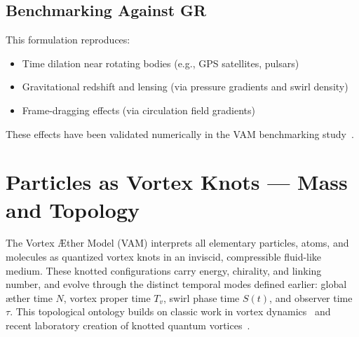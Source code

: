 \documentclass[preprint]{revtex4-2}
\begin{document}
    \subsection{Benchmarking Against GR}
    This formulation reproduces:
    \begin{itemize}
        \item Time dilation near rotating bodies (e.g., GPS satellites, pulsars)
        \item Gravitational redshift and lensing (via pressure gradients and swirl density)
        \item Frame-dragging effects (via circulation field gradients)
    \end{itemize}
    These effects have been validated numerically in the VAM benchmarking study~\cite{vam_benchmark2025}.


\section{Particles as Vortex Knots — Mass and Topology}
    The Vortex \AE{}ther Model (VAM) interprets all elementary particles, atoms, and molecules as quantized vortex knots in an inviscid, compressible fluid-like medium. These knotted configurations carry energy, chirality, and linking number, and evolve through the distinct temporal modes defined earlier: global æther time \( N \), vortex proper time \( T_v \), swirl phase time \( S(t) \), and observer time \( \tau \). This topological ontology builds on classic work in vortex dynamics~\cite{moffatt1969degree, arnold1998topological, saffman1992vortex} and recent laboratory creation of knotted quantum vortices~\cite{kleckner2013creation}.
\end{document}
